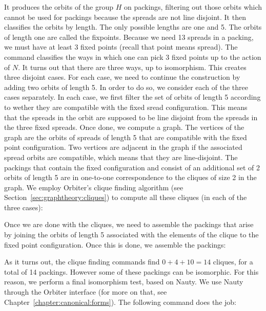 It produces the orbits of the group $H$ on packings, filtering out those orbits 
which cannot be used for packings because the spreads are not line disjoint. 
It then classifies the orbits by length. The only possible lengths are one and 5. 
The orbits of length one are called the fixpoints. 
Because we need 13 spreads in a packing, we must have at least 3 fixed points 
(recall that point means spread).
The command classifies the ways in which one can pick 3 
fixed points up to the action of $N$. 
It turns out that there are three ways, up to isomorphism. 
This creates three disjoint cases.
For each case, we need to continue the construction by adding two orbits of length 5.
In order to do so, we consider each of the three cases separately. 
In each case, we first filter the set of orbits of length 5 according 
to wether they are compatible with the fixed sread configuration. 
This means that the spreads in the orbit are supposed 
to be line disjoint from the spreads in the three fixed spreads. 
Once done, we compute a graph. 
The vertices of the graph are the orbits of spreads of length 5 
that are compatible with the fixed point configuration. 
Two vertices are adjacent in the graph 
if the associated spread orbits 
are compatible, which means that they are line-disjoint. 
The packings that contain the fixed configuration and 
consist of an additional set of 2 orbits of length 5 
are in one-to-one correspondence to the cliques of size 2 in the graph.
We employ Orbiter's clique finding algorithm (see Section~\ref{sec:graphtheory:cliques}) 
to compute all these cliques (in each of the three cases):




Once we are done with the cliques, 
we need to assemble the packings that arise 
by joining the orbits of length 5 associated 
with the elements of the clique to the fixed point configuration. 
Once this is done, we assemble the packings:



As it turns out, the clique finding commands find $0+4+10=14$ cliques, 
for a total of 14 packings. However some of these packings can be isomorphic. 
For this reason, we  perform a final isomorphism test, based on Nauty. 
We use Nauty through the Orbiter interface 
(for more on that, see Chapter~\ref{chapter:canonical:forms}). 
The following command does the job:



